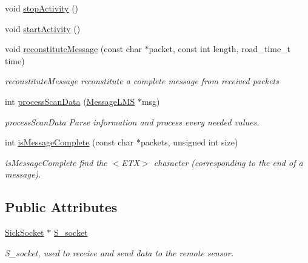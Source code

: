 \begin{DoxyCompactItemize}
\item 
void \hyperlink{classpacpus_1_1SickLMSSensor_a082417a753cef1d4f726c50b2e14a4d0}{stop\-Activity} ()
\item 
void \hyperlink{classpacpus_1_1SickLMSSensor_a6268a9b5b17db84b662c562ea332541f}{start\-Activity} ()
\item 
void \hyperlink{classpacpus_1_1SickLMSSensor_a3182c21683131e52c520d45bd4a23dae}{reconstitute\-Message} (const char $\ast$packet, const int length, road\-\_\-time\-\_\-t time)
\begin{DoxyCompactList}\small\item\em reconstitute\-Message reconstitute a complete message from received packets \end{DoxyCompactList}\item 
int \hyperlink{classpacpus_1_1SickLMSSensor_a4ba9228b2f513fc3d7dcac5813065212}{process\-Scan\-Data} (\hyperlink{classpacpus_1_1MessageLMS}{Message\-L\-M\-S} $\ast$msg)
\begin{DoxyCompactList}\small\item\em process\-Scan\-Data Parse information and process every needed values. \end{DoxyCompactList}\item 
int \hyperlink{classpacpus_1_1SickLMSSensor_a0993b71ac52777e6588e57bb261c8ae9}{is\-Message\-Complete} (const char $\ast$packets, unsigned int size)
\begin{DoxyCompactList}\small\item\em is\-Message\-Complete find the $<$\-E\-T\-X$>$ character (corresponding to the end of a message). \end{DoxyCompactList}\end{DoxyCompactItemize}
\subsection*{Public Attributes}
\begin{DoxyCompactItemize}
\item 
\hypertarget{classpacpus_1_1SickLMSSensor_a33a0af999049a7d9a35e1719d9d9cd48}{\hyperlink{classpacpus_1_1SickSocket}{Sick\-Socket} $\ast$ \hyperlink{classpacpus_1_1SickLMSSensor_a33a0af999049a7d9a35e1719d9d9cd48}{S\-\_\-socket}}\label{classpacpus_1_1SickLMSSensor_a33a0af999049a7d9a35e1719d9d9cd48}

\begin{DoxyCompactList}\small\item\em S\-\_\-socket, used to receive and send data to the remote sensor. \end{DoxyCompactList}\end{DoxyCompactItemize}
